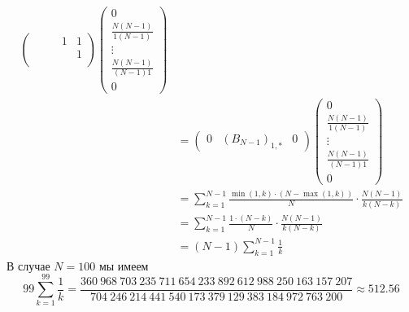 \documentclass[12pt,a4paper]{article}
\begin{document}
\begin{enumproblem}
\begin{align*}
\begin{pmatrix}
                &&& 1& 1\\
                &&&& 1\\
            \end{pmatrix}
            \begin{pmatrix}
                0\\ \frac{N(N-1)}{1(N-1)}\\ \vdots\\ \frac{N(N-1)}{(N-1)1}\\ 0
            \end{pmatrix}\\
            &=
            \begin{pmatrix}
                0& (B_{N-1})_{1, *}& 0
            \end{pmatrix}
            \begin{pmatrix}
                0\\ \frac{N(N-1)}{1(N-1)}\\ \vdots\\ \frac{N(N-1)}{(N-1)1}\\ 0
            \end{pmatrix}\\
            &= \sum_{k=1}^{N-1} \frac{\min(1, k) \cdot (N - \max(1, k))}{N} \cdot \frac{N(N-1)}{k(N-k)}\\
            &= \sum_{k=1}^{N-1} \frac{1 \cdot (N - k)}{N} \cdot \frac{N(N-1)}{k(N-k)}\\
            &= (N-1)\sum_{k=1}^{N-1} \frac{1}{k}
        \end{align*}
        В случае $N = 100$ мы имеем
        \[
            99 \sum_{k=1}^{99} \frac{1}{k}
            = \frac{360\ 968\ 703\ 235\ 711\ 654\ 233\ 892\ 612\ 988\ 250\ 163\ 157\ 207}{704\ 246\ 214\ 441\ 540\ 173\ 379\ 129\ 383\ 184\ 972\ 763\ 200} \approx 512.56
        \]
    \end{enumproblem}
\end{document}
